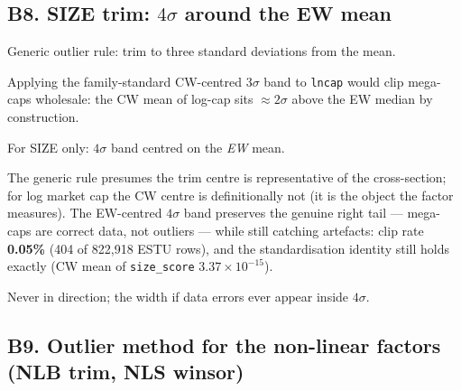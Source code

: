 \documentclass[11pt,a4paper]{article}
\begin{document}
\subsection{B8. SIZE trim: $4\sigma$ around the EW mean}

\begin{description}[style=nextline]
  \item[USE4] Generic outlier rule: trim to three standard deviations from the
    mean.
  \item[Deviation] Applying the family-standard CW-centred $3\sigma$ band to
    \texttt{lncap} would clip mega-caps wholesale: the CW mean of log-cap sits
    $\approx 2\sigma$ above the EW median by construction.
  \item[Solution] For SIZE only: $4\sigma$ band centred on the \emph{EW} mean.
  \item[Validity] The generic rule presumes the trim centre is representative
    of the cross-section; for log market cap the CW centre is definitionally
    not (it is the object the factor measures). The EW-centred $4\sigma$ band
    preserves the genuine right tail --- mega-caps are correct data, not
    outliers --- while still catching artefacts: clip rate \textbf{0.05\%}
    (404 of 822{,}918 ESTU rows), and the standardisation identity still holds
    exactly (CW mean of \texttt{size\_score} $3.37\times10^{-15}$).
  \item[Revisit when] Never in direction; the width if data errors ever appear
    inside $4\sigma$.
\end{description}

\subsection{B9. Outlier method for the non-linear factors (NLB trim, NLS winsor)}
\end{document}
